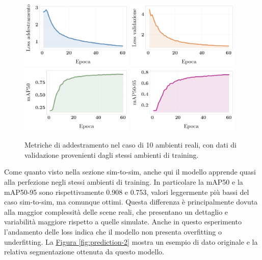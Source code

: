 \documentclass[12pt]{report}
\begin{document}
\begin{figure}[t]
	\centering
	{\includegraphics[width=0.48\textwidth]{images/domain-shift/real-to-real/4/train-loss}}
	\hspace{0.01\textwidth}
	{\includegraphics[width=0.48\textwidth]{images/domain-shift/real-to-real/4/validation-loss}}
	\hspace{0.01\textwidth}
	\\
	{\includegraphics[width=0.48\textwidth]{images/domain-shift/real-to-real/4/map50}}
	\hspace{0.01\textwidth}
	{\includegraphics[width=0.48\textwidth]{images/domain-shift/real-to-real/4/map50-95}}
	\caption{Metriche di addestramento nel caso di 10 ambienti reali, con dati di validazione provenienti dagli stessi ambienti di training.}
	\label{fig:training-3}
\end{figure}

Come quanto visto nella sezione sim-to-sim, anche qui il modello apprende quasi alla perfezione negli stessi ambienti di training. In particolare la mAP50 e la mAP50-95 sono rispettivamente 0.908 e 0.753, valori leggermente più bassi del caso sim-to-sim, ma comunque ottimi. Questa differenza è principalmente dovuta alla maggior complessità delle scene reali, che presentano un dettaglio e variabilità maggiore rispetto a quelle simulate. Anche in questo esperimento l'andamento delle loss indica che il modello non presenta overfitting o underfitting. La \hyperref[fig:prediction-2]{Figura \ref{fig:prediction-2}} mostra un esempio di dato originale e la relativa segmentazione ottenuta da questo modello.
\end{document}
